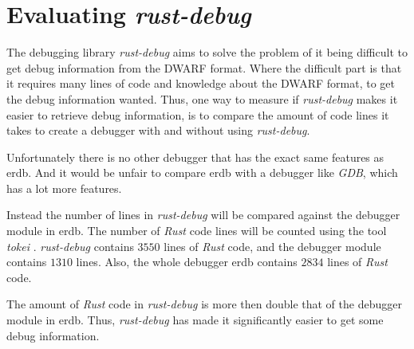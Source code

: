 
\section{Evaluating \emph{rust-debug}} \label{sec:evalrd}
The debugging library \emph{rust-debug} aims to solve the problem of it being difficult to get debug information from the \gls{DWARF} format.
Where the difficult part is that it requires many lines of code and knowledge about the \gls{DWARF} format, to get the debug information wanted.
Thus, one way to measure if \emph{rust-debug} makes it easier to retrieve debug information, is to compare the amount of code lines it takes to create a debugger with and without using \emph{rust-debug}.


Unfortunately there is no other debugger that has the exact same features as \gls{erdb}.
And it would be unfair to compare \gls{erdb} with a debugger like \emph{GDB}, which has a lot more features.


Instead the number of lines in \emph{rust-debug} will be compared against the debugger module in \gls{erdb}.
The number of \emph{Rust} code lines will be counted using the tool \emph{tokei} \cite{tokei}.
\emph{rust-debug} contains $3550$ lines of \emph{Rust} code, and the debugger module contains $1310$ lines.
Also, the whole debugger \gls{erdb} contains $2834$ lines of \emph{Rust} code.


The amount of \emph{Rust} code in \emph{rust-debug} is more then double that of the debugger module in \gls{erdb}.
Thus, \emph{rust-debug} has made it significantly easier to get some debug information.



